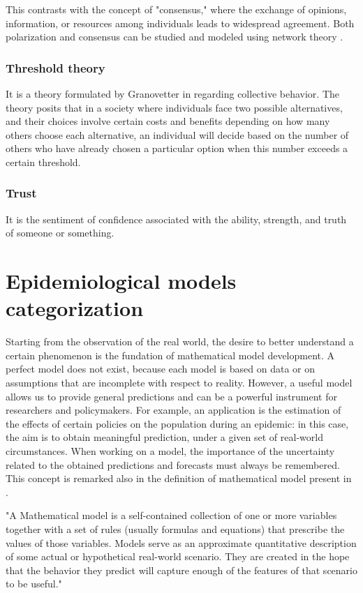 This contrasts with the concept of "consensus," where the exchange of opinions, information, or resources among individuals leads to widespread agreement. Both polarization and consensus can be studied and modeled using network theory \cite{Devia2022}.
\subsubsection{Threshold theory}
It is a theory formulated by Granovetter in \cite{Granovetter_1978} regarding collective behavior. The theory posits that in a society where individuals face two possible alternatives, and their choices involve certain costs and benefits depending on how many others choose each alternative, an individual will decide based on the number of others who have already chosen a particular option when this number exceeds a certain threshold.

\subsubsection{Trust} It is the sentiment of confidence associated with the ability, strength, and truth of someone or something. 

\section{Epidemiological models categorization}
\label{sec:models_categ}
Starting from the observation of the real world, the desire to better understand a certain phenomenon is the fundation of mathematical model development. A perfect model does not exist, because each model is based on data or on assumptions that are incomplete with respect to reality. However, a useful model allows us to provide general predictions and can be a powerful instrument for researchers and policymakers. For example, an application is the estimation of the effects of certain policies on the population during an epidemic: in this case, the aim is to obtain meaningful prediction, under a given set of real-world circumstances.
When working on a model, the importance of the uncertainty related to the obtained predictions and forecasts must always be remembered. This concept is remarked also in the definition of mathematical model present in \cite{Ledder_2023}. 
\begin{displayquote}
	"A Mathematical model is a self-contained collection of one or more variables together with a set of rules (usually formulas and equations) that prescribe the values of those variables. Models serve as an approximate quantitative description of some actual or hypothetical real-world scenario. They are created in the hope that the behavior they predict will capture enough of the features of that scenario to be useful."
\end{displayquote}

